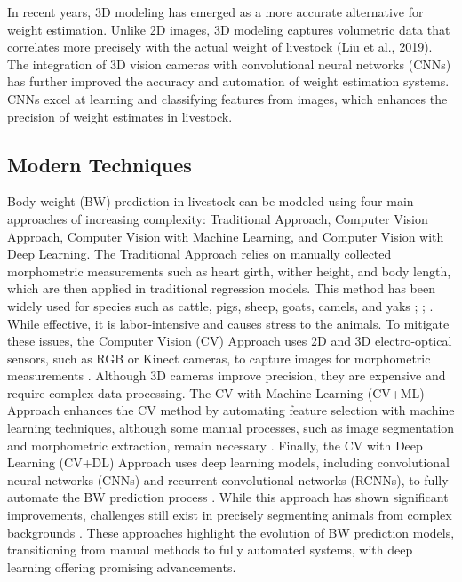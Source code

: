 {In recent years, 3D modeling has emerged as a more accurate alternative for weight estimation. Unlike 2D images, 3D modeling captures volumetric data that correlates more precisely with the actual weight of livestock (Liu et al., 2019). The integration of 3D vision cameras with convolutional neural networks (CNNs) has further improved the accuracy and automation of weight estimation systems. CNNs excel at learning and classifying features from images, which enhances the precision of weight estimates in livestock.

\subsection{Modern Techniques}

Body weight (BW) prediction in livestock can be modeled using four main approaches of increasing complexity: Traditional Approach, Computer Vision Approach, Computer Vision with Machine Learning, and Computer Vision with Deep Learning. The Traditional Approach relies on manually collected morphometric measurements such as heart girth, wither height, and body length, which are then applied in traditional regression models. This method has been widely used for species such as cattle, pigs, sheep, goats, camels, and yaks \citep{franco2017evaluation}; \citep{fadlelmoula2020prediction}; \citep{yan2019body}. While effective, it is labor-intensive and causes stress to the animals. To mitigate these issues, the Computer Vision (CV) Approach uses 2D and 3D electro-optical sensors, such as RGB or Kinect cameras, to capture images for morphometric measurements \citep{ozkaya2013prediction}. Although 3D cameras improve precision, they are expensive and require complex data processing. The CV with Machine Learning (CV+ML) Approach enhances the CV method by automating feature selection with machine learning techniques, although some manual processes, such as image segmentation and morphometric extraction, remain necessary \citep{tasdemir2019ann}. Finally, the CV with Deep Learning (CV+DL) Approach uses deep learning models, including convolutional neural networks (CNNs) and recurrent convolutional networks (RCNNs), to fully automate the BW prediction process \citep{gjergji2020deep}. While this approach has shown significant improvements, challenges still exist in precisely segmenting animals from complex backgrounds \citep{shukla2016metric}. These approaches highlight the evolution of BW prediction models, transitioning from manual methods to fully automated systems, with deep learning offering promising advancements.

}
